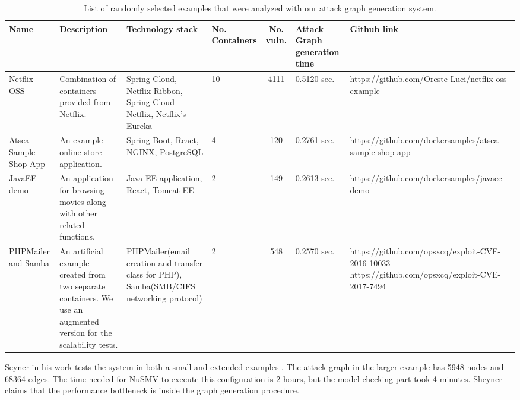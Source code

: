 \begin{table*}
	\begin{center}
		\begin{tabular}{ |p{20mm}|p{25mm}|p{20mm}|p{10mm}|c|p{15mm}|p{45mm}| } 
			\hline
			Name & Description & Technology stack & No. Containers & No. vuln. & Attack Graph generation time & Github link \\\hline 
			
			Netflix OSS & Combination of containers provided from Netflix. & Spring Cloud, Netflix Ribbon, Spring Cloud Netflix, Netflix's Eureka & 10 & 4111 & 0.5120 sec. & https://github.com/Oreste-Luci/netflix-oss-example \\\hline
			
			Atsea Sample Shop App & An example online store application. & Spring Boot, React, NGINX, PostgreSQL & 4 & 120 & 0.2761 sec. & https://github.com/dockersamples/atsea-sample-shop-app \\\hline
			
			JavaEE demo & An application for browsing movies along with other related functions. & Java EE application, React, Tomcat EE & 2 & 149 & 0.2613 sec. & https://github.com/dockersamples/javaee-demo \\\hline
			
			PHPMailer and Samba & An artificial example created from two separate containers. We use an augmented version for the scalability tests. & PHPMailer(email creation and transfer class for PHP), Samba(SMB/CIFS networking protocol) & 2 & 548 & 0.2570 sec. & https://github.com/opsxcq/exploit-CVE-2016-10033
			https://github.com/opsxcq/exploit-CVE-2017-7494 \\\hline
			
			
			\hline
		\end{tabular}
	\end{center}
	
	\caption{List of randomly selected examples that were analyzed with our attack graph generation system.}
	\label{table_technologies}
	
\end{table*}

Seyner in his work tests the system in both a small and extended examples \cite{sheyner2002automated}. The attack graph in the larger example has 5948 nodes and 68364 edges. The time needed for NuSMV to execute this configuration is 2 hours, but the model checking part took 4 minutes. Sheyner claims that the performance bottleneck is inside the graph generation procedure. 

